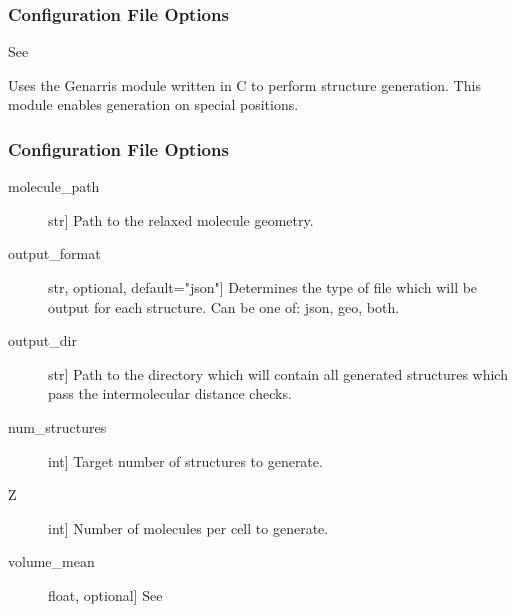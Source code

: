 \documentclass[letterpaper,10pt,english]{sphinxmanual}
\begin{document}
\begin{fulllineitems}
\begin{fulllineitems}
\subsubsection*{Configuration File Options}

See {\hyperref[\detokenize{index:Genarris.genarris_master.Genarris.Run_FHI_Aims_Batch}]{}}

\end{fulllineitems}


\begin{fulllineitems}
\label{\detokenize{index:Genarris.genarris_master.Genarris.Pygenarris_Structure_Generation}}
Uses the Genarris module written in C to perform structure generation.
This module enables generation on special positions.
\subsubsection*{Configuration File Options}
\begin{description}
\item[{molecule\_path}] \leavevmode{[}str{]}
Path to the relaxed molecule geometry.

\item[{output\_format}] \leavevmode{[}str, optional, default="json"{]}
Determines the type of file which will be output for each
structure. Can be one of: json, geo, both.

\item[{output\_dir}] \leavevmode{[}str{]}
Path to the directory which will contain all generated structures
which pass the intermolecular distance checks.

\item[{num\_structures}] \leavevmode{[}int{]}
Target number of structures to generate.

\item[{Z}] \leavevmode{[}int{]}
Number of molecules per cell to generate.

\item[{volume\_mean}] \leavevmode{[}float, optional{]}
See {\hyperref[\detokenize{index:Genarris.genarris_master.Genarris.Estimate_Unit_Cell_Volume}]{}}


\end{description}
\end{fulllineitems}
\end{fulllineitems}
\end{document}
